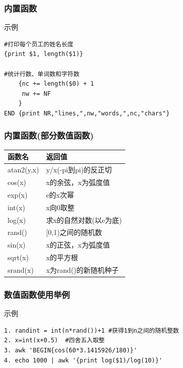 \documentclass[xcolor=svgnames,presentation]{beamer}
\begin{document}
\begin{frame}[fragile]
\frametitle{内置函数}
\label{sec-2-2-12}
\begin{exampleblock}{示例}
\label{sec-2-2-12-1}


\begin{verbatim}
#打印每个员工的姓名长度
{print $1, length($1)}

#统计行数、单词数和字符数
    {nc += length($0) + 1
     nw += NF
    }
END {print NR,"lines,",nw,"words,",nc,"chars"}
\end{verbatim}
\end{exampleblock}
\end{frame}
\begin{frame}
\frametitle{内置函数(部分数值函数)}
\label{sec-2-2-13}


\begin{center}
\begin{tabular}{ll}
 函数名      &  返回值                  \\
\hline
 atan2(y,x)  &  y/x(-pi到pi)的反正切    \\
 cos(x)      &  x的余弦，x为弧度值      \\
 exp(x)      &  e的x次幂                \\
 int(x)      &  x向0取整                \\
 log(x)      &  求x的自然对数(以e为底)  \\
 rand()      &  [0,1)之间的随机数       \\
 sin(x)      &  x的正弦，x为弧度值      \\
 sqrt(x)     &  x的平方根               \\
 srand(x)    &  x为rand()的新随机种子   \\
\end{tabular}
\end{center}
\end{frame}
\begin{frame}[fragile]
\frametitle{数值函数使用举例}
\label{sec-2-2-14}
\begin{exampleblock}{示例}
\label{sec-2-2-14-1}


\begin{verbatim}
1. randint = int(n*rand())+1 #获得1到n之间的随机整数
2. x=int(x+0.5)  #四舍五入取整
3. awk 'BEGIN{cos(60*3.1415926/180)}'
4. echo 1000 | awk '{print log($1)/log(10)}'
\end{verbatim}
\end{exampleblock}
\end{frame}
\end{document}
